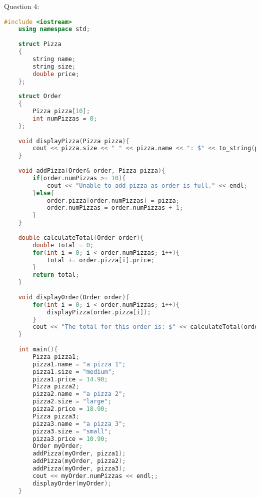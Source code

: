 \documentclass{article}
\begin{document}
\vspace{1cm}

Question 4:

\begin{lstlisting}[language=C++]
    #include <iostream>
    using namespace std;
    
    struct Pizza
    {
        string name;
        string size;
        double price;
    };
    
    struct Order
    {
        Pizza pizza[10];
        int numPizzas = 0;
    };
    
    void displayPizza(Pizza pizza){
        cout << pizza.size << " " << pizza.name << ": $" << to_string(pizza.price) << endl;
    }
    
    void addPizza(Order& order, Pizza pizza){
        if(order.numPizzas >= 10){
            cout << "Unable to add pizza as order is full." << endl;
        }else{
            order.pizza[order.numPizzas] = pizza;
            order.numPizzas = order.numPizzas + 1;
        }
    }
    
    double calculateTotal(Order order){
        double total = 0;
        for(int i = 0; i < order.numPizzas; i++){
            total += order.pizza[i].price;
        }
        return total;
    }
    
    void displayOrder(Order order){
        for(int i = 0; i < order.numPizzas; i++){
            displayPizza(order.pizza[i]);
        }
        cout << "The total for this order is: $" << calculateTotal(order) << endl;
    }
    
    int main(){
        Pizza pizza1;
        pizza1.name = "a pizza 1";
        pizza1.size = "medium";
        pizza1.price = 14.90;
        Pizza pizza2;
        pizza2.name = "a pizza 2";
        pizza2.size = "large";
        pizza2.price = 18.90;
        Pizza pizza3;
        pizza3.name = "a pizza 3";
        pizza3.size = "small";
        pizza3.price = 10.90;
        Order myOrder;
        addPizza(myOrder, pizza1);
        addPizza(myOrder, pizza2);
        addPizza(myOrder, pizza3);
        cout << myOrder.numPizzas << endl;;
        displayOrder(myOrder);
    }
\end{lstlisting}
\end{document}
